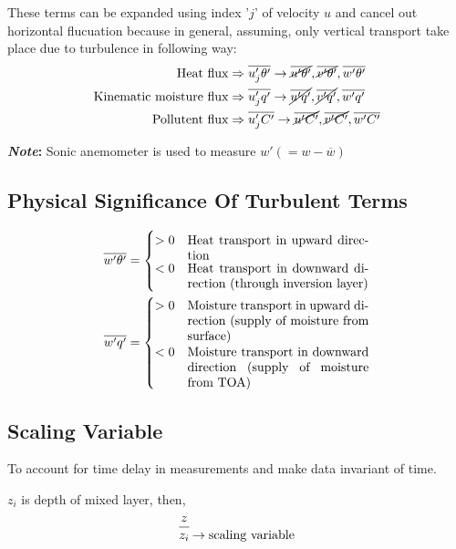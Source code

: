 \documentclass[fleqn,10pt]{SelfArx} %
\newcommand*{\bfrac}[2]{\genfrac{}{}{0pt}{}{#1}{#2}}
\begin{document}
These terms can be expanded using index '\( j \)' of velocity \( u \) and cancel out horizontal flucuation because in general, assuming, only vertical transport take place due to turbulence in following way:
\begin{align*}
	\text{Heat flux} &\Rightarrow \overline{u_j'\theta'} \rightarrow \cancel{\overline{u'\theta'}}, \cancel{\overline{v'\theta'}}, \overline{w'\theta'} \\
	\text{Kinematic moisture flux} &\Rightarrow \overline{u_j'q'} \rightarrow \cancel{\overline{u'q'}}, \cancel{\overline{v'q'}}, \overline{w'q'} \\
	\text{Pollutent flux} &\Rightarrow \overline{u_j'C'} \rightarrow \cancel{\overline{u'C'}}, \cancel{\overline{v'C'}}, \overline{w'C'}
\end{align*}

\textbf{\textit{Note}:} Sonic anemometer is used to measure \(w' \left(=w-\overline{w}\right) \)

\subsection{Physical Significance Of Turbulent Terms}
\begin{align*}
	\overline{w'\theta'} &=
	\begin{cases}
		>0 & \parbox[t]{5cm}{Heat transport in upward direction} \\
		<0 & \parbox[t]{5cm}{Heat transport in downward direction (through inversion layer)}
	\end{cases} \\
	\overline{w'q'} &=
	\begin{cases}
		>0 & \parbox[t]{5cm}{Moisture transport in upward direction (supply of moisture from surface)} \\
		<0 & \parbox[t]{5cm}{Moisture transport in downward direction (supply of moisture from TOA)}
	\end{cases}
\end{align*}

\subsection{Scaling Variable}
To account for time delay in measurements and make data invariant of time.

\( z_i \) is depth of mixed layer, then,
\begin{align*}
	\frac{z}{z_i} \bfrac{}{\rightarrow \text{scaling variable}}
\end{align*}
\end{document}
